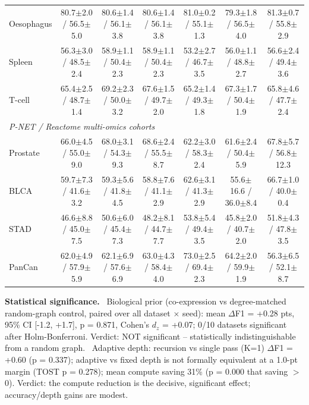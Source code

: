 \begin{table}[p]
{\begin{tabular}{lcccccc}
Oesophagus & 80.7$\pm$2.0 / 56.5$\pm$5.0 & 80.6$\pm$1.4 / 56.1$\pm$3.8 & 80.6$\pm$1.4 / 56.1$\pm$3.8 & 81.0$\pm$0.2 / 55.1$\pm$1.3 & 79.3$\pm$1.8 / 56.5$\pm$4.0 & 81.3$\pm$0.7 / 55.8$\pm$2.9 \\
Spleen & 56.3$\pm$3.0 / 48.5$\pm$2.4 & 58.9$\pm$1.1 / 50.4$\pm$2.3 & 58.9$\pm$1.1 / 50.4$\pm$2.3 & 53.2$\pm$2.7 / 46.7$\pm$3.5 & 56.0$\pm$1.1 / 48.8$\pm$2.7 & 56.6$\pm$2.4 / 49.4$\pm$3.6 \\
T-cell & 65.4$\pm$2.5 / 48.7$\pm$1.4 & 69.2$\pm$2.3 / 50.0$\pm$3.2 & 67.6$\pm$1.5 / 49.7$\pm$2.0 & 65.2$\pm$1.4 / 49.3$\pm$1.8 & 67.3$\pm$1.7 / 50.4$\pm$1.9 & 65.8$\pm$4.6 / 47.7$\pm$2.4 \\
\midrule
\multicolumn{7}{l}{\textit{P-NET / Reactome multi-omics cohorts}}\\
\midrule
Prostate & 66.0$\pm$4.5 / 55.0$\pm$9.0 & 68.0$\pm$3.1 / 54.3$\pm$9.3 & 68.6$\pm$2.4 / 55.5$\pm$8.7 & 62.2$\pm$3.0 / 58.3$\pm$2.4 & 61.6$\pm$2.4 / 50.4$\pm$5.9 & 67.8$\pm$5.7 / 56.8$\pm$12.3 \\
BLCA & 59.7$\pm$7.3 / 41.6$\pm$3.2 & 59.3$\pm$5.6 / 41.8$\pm$4.5 & 58.8$\pm$7.6 / 41.1$\pm$2.9 & 62.6$\pm$3.1 / 41.3$\pm$2.9 & 55.6$\pm$16.6 / 36.0$\pm$8.4 & 66.7$\pm$1.0 / 40.0$\pm$0.4 \\
STAD & 46.6$\pm$8.8 / 45.0$\pm$7.5 & 50.6$\pm$6.0 / 45.4$\pm$7.3 & 48.2$\pm$8.1 / 44.7$\pm$7.7 & 53.8$\pm$5.4 / 49.4$\pm$3.5 & 45.8$\pm$2.0 / 40.7$\pm$2.0 & 51.8$\pm$4.3 / 47.8$\pm$3.5 \\
PanCan & 62.0$\pm$4.9 / 57.9$\pm$5.9 & 62.1$\pm$6.9 / 57.6$\pm$6.9 & 63.0$\pm$4.3 / 58.4$\pm$4.0 & 73.0$\pm$2.5 / 69.4$\pm$2.3 & 64.2$\pm$2.0 / 59.9$\pm$1.9 & 56.3$\pm$6.5 / 52.1$\pm$8.7 \\
\bottomrule
\end{tabular}}
\vspace{6pt}
\par\noindent\footnotesize\textbf{Statistical significance.} 
\textbullet~Biological prior (co-expression vs degree-matched random-graph control, paired over all dataset $\times$ seed): mean $\Delta$F1 = +0.28 pts, 95\% CI [-1.2, +1.7], p = 0.871, Cohen's $d_z$ = +0.07; 0/10 datasets significant after Holm-Bonferroni. Verdict: NOT significant -- statistically indistinguishable from a random graph. \textbullet~Adaptive depth: recursion vs single pass (K=1) $\Delta$F1 = +0.60 (p = 0.337); adaptive vs fixed depth is not formally equivalent at a 1.0-pt margin (TOST p = 0.278); mean compute saving 31\% (p = 0.000 that saving $>$ 0). Verdict: the compute reduction is the decisive, significant effect; accuracy/depth gains are modest.
\end{table}
